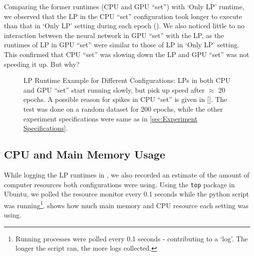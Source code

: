 \begin{appendices}
    Comparing the former runtimes (CPU and GPU ``set'') with `Only LP' runtime, we observed that the LP in the CPU ``set'' configuration took longer to execute than that in `Only LP' setting during each epoch (). We also noticed little to no interaction between the neural network in GPU ``set'' with the LP, as the runtimes of LP in GPU ``set'' were similar to those of LP in `Only LP' setting. This confirmed that CPU ``set'' was slowing down the LP and GPU ``set'' was not speeding it up. But why?
    \begin{figure}[!htbp]
        \centering
        \caption[LP Runtime Example for Different Configurations]{LP Runtime Example for Different Configurations: LPs in both CPU and GPU ``set'' start running slowly, but pick up speed after $\approx$ 20 epochs. A possible reason for spikes in CPU ``set'' is given in []. The test was done on a random dataset for 200 epochs, while the other experiment specifications were same as in \cref{sec:Experiment Specifications}.}
        \label{fig:LP Runtime Example for Different Configurations}
    \end{figure}
    
    \subsection{CPU and Main Memory Usage} \label{app:CPU and Main Memory Usage}
    While logging the LP runtimes in , we also recorded an estimate of the amount of computer resources both configurations were using. Using the \texttt{top} package in Ubuntu, we polled the resource monitor every 0.1 seconds while the python script was running\footnote{\label{foo:logs not epochs} Running processes were polled every 0.1 seconds - contributing to a `log'. The longer the script ran, the more logs collected.}.  shows how much main memory and CPU resource each setting was using.
    

\end{appendices}

